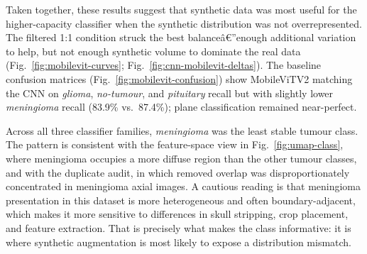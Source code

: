 \documentclass[conference,twoside]{IEEEtran}
\begin{document}
Taken together, these results suggest that synthetic data was most useful for the higher-capacity classifier when the synthetic distribution was not overrepresented. The filtered 1:1 condition struck the best balanceâ€”enough additional variation to help, but not enough synthetic volume to dominate the real data (Fig.~\ref{fig:mobilevit-curves}; Fig.~\ref{fig:cnn-mobilevit-deltas}). The baseline confusion matrices (Fig.~\ref{fig:mobilevit-confusion}) show MobileViTV2 matching the CNN on \textit{glioma}, \textit{no-tumour}, and \textit{pituitary} recall but with slightly lower \textit{meningioma} recall (83.9\% vs.\ 87.4\%); plane classification remained near-perfect.

Across all three classifier families, \textit{meningioma} was the least stable tumour class. The pattern is consistent with the feature-space view in Fig.~\ref{fig:umap-class}, where meningioma occupies a more diffuse region than the other tumour classes, and with the duplicate audit, in which removed overlap was disproportionately concentrated in meningioma axial images. A cautious reading is that meningioma presentation in this dataset is more heterogeneous and often boundary-adjacent, which makes it more sensitive to differences in skull stripping, crop placement, and feature extraction. That is precisely what makes the class informative: it is where synthetic augmentation is most likely to expose a distribution mismatch.
\end{document}
